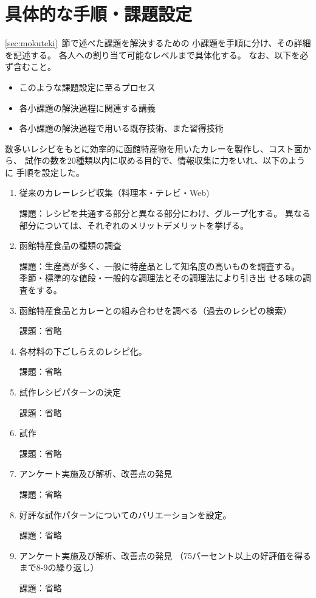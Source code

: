\documentclass[openany,11pt,papersize]{jsbook}
\begin{document}
\section{具体的な手順・課題設定}\label{sec:tejun}
\begin{hissu}
\ref{sec:mokuteki}~節で述べた課題を解決するための
小課題を手順に分け、その詳細を記述する。
各人への割り当て可能なレベルまで具体化する。
なお、以下を必ず含むこと。
\begin{itemize}
 \item このような課題設定に至るプロセス　
 \item 各小課題の解決過程に関連する講義
 \item 各小課題の解決過程で用いる既存技術、また習得技術
\end{itemize}
\end{hissu}

数多いレシピをもとに効率的に函館特産物を用いたカレーを製作し、コスト面から、
試作の数を20種類以内に収める目的で、情報収集に力をいれ、以下のように
手順を設定した。

\begin{enumerate}
\item 従来のカレーレシピ収集（料理本・テレビ・Web)
\par 課題：レシピを共通する部分と異なる部分にわけ、グループ化する。
     異なる部分については、それぞれのメリットデメリットを挙げる。　　

\item 函館特産食品の種類の調査
\par 課題：生産高が多く、一般に特産品として知名度の高いものを調査する。
           季節・標準的な値段・一般的な調理法とその調理法により引き出
           せる味の調査をする。　　
 　
\item 函館特産食品とカレーとの組み合わせを調べる（過去のレシピの検索）
\par 課題：省略
 　　　
\item 各材料の下ごしらえのレシピ化。
\par 課題：省略
 　　　
\item 試作レシピパターンの決定
\par 課題：省略
 　　　
\item 試作
\par 課題：省略
 　　　
\item アンケート実施及び解析、改善点の発見
\par 課題：省略

\item 好評な試作パターンについてのバリエーションを設定。　　　
\par 課題：省略
 　　　
\item アンケート実施及び解析、改善点の発見
（75パーセント以上の好評価を得るまで8-9の繰り返し）
\par 課題：省略
\end{enumerate}
\end{document}
